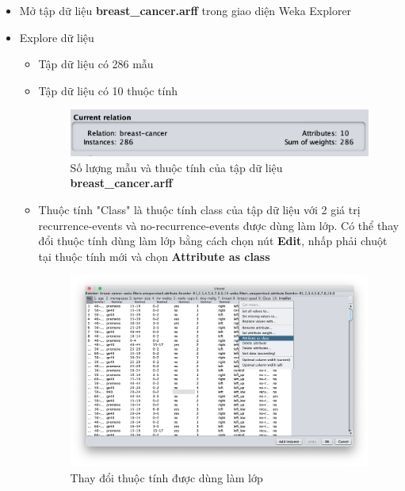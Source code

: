 \documentclass[a4paper, 12pt]{article}
\begin{document}
\begin{itemize}
    \item Mở tập dữ liệu \textbf{breast\_cancer.arff} trong giao diện Weka Explorer
    \item Explore dữ liệu
    \begin{itemize}
        \item Tập dữ liệu có 286 mẫu
        \item Tập dữ liệu có 10 thuộc tính
        \begin{figure}[H]
            \begin{center}
                \includegraphics[scale = 0.75]{images/attribute_instance.png}
                \caption{Số lượng mẫu và thuộc tính của tập dữ liệu \textbf{breast\_cancer.arff}}
            \end{center}
        \end{figure}
        \item Thuộc tính "Class" là thuộc tính class của tập dữ liệu với 2 giá trị recurrence-events và no-recurrence-events được dùng làm lớp. Có thể thay đổi thuộc tính dùng làm lớp bằng cách chọn nút \textbf{Edit}, nhấp phải chuột tại thuộc tính mới và chọn \textbf{Attribute as class}
        \begin{figure}[H]
            \begin{center}
                \includegraphics[scale = 0.45]{./images/changeClass.png}
                \caption{Thay đổi thuộc tính được dùng làm lớp}
            \end{center}
        \end{figure}


\end{itemize}
\end{itemize}
\end{document}
